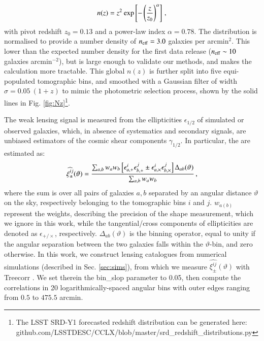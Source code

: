 \begin{eqnarray}
n (z) =  z^2 \: {\rm exp} \left[-\left(\frac{z}{z_0}\right)^\alpha \right]\, ,
\label{eq:nz}
\end{eqnarray}
with pivot redshift $z_0=0.13$ and a power-law index $\alpha = 0.78$.
The distribution is normalised to provide a number density of $n_{\rm eff} = 3.0 $  galaxies per arcmin$^{2}$.
This lower than the expected number density for the first data release ($n_{\rm eff}\sim10$ galaxies arcmin$^{-2}$), but is large enough to validate our methods, and makes the calculation more tractable.
This global $n(z)$ is further split into five equi-populated tomographic bins, and smoothed with a Gaussian filter of width $\sigma = 0.05 \: (1 + z)$ to mimic the photometric selection process, shown by the solid lines in Fig. \ref{fig:Nz}\footnote{The LSST SRD-Y1 forecasted redshift distribution can be generated here: github.com/LSSTDESC/CCLX/blob/master/srd\_redshift\_distributions.py}. 

The weak lensing signal is measured from the ellipticities $\epsilon_{1/2}$ of simulated or observed galaxies, which, in absence of systematics and secondary signals, are unbiased estimators  of the cosmic shear components $\gamma_{1/2}$.
In particular, the \gtwopcf are estimated as:
\begin{eqnarray}
\widehat{\xi_{\pm}^{ij}}(\vartheta) = \frac{\sum_{a,b} w_a w_b \left[\epsilon_{a, \rm +}^i\epsilon_{b, \rm +}^j     \pm \epsilon_{a, \times}^i\epsilon_{b, \times}^j    \right]\Delta_{ab}(\vartheta)}{\sum_{a,b} w_a w_b} \, ,
\label{eq:2PCF_estimator}
\end{eqnarray}
where the sum is over all pairs of galaxies $a, b$ separated by an angular distance $\vartheta$ on the sky, respectively belonging to the tomographic bins $i$ and $j$.
$w_{a (b)}$ represent the weights, describing the precision of the shape measurement, which we ignore in this work, while the tangential/cross components of ellipticities are denoted as $\epsilon_{+/\times}$, respectively. 
$\Delta_{ab}(\vartheta)$ is the binning operator, equal to unity if the angular separation between the two galaxies falls within the $\vartheta$-bin, and zero otherwise.
In this work, we construct lensing catalogues from numerical simulations (described in Sec. \ref{sec:sims}), from which we measure $ \widehat{\xi_{\pm}^{ij}}(\vartheta)$ with {\sc Treecorr} \citep{TreeCorr}.
We set therein the {\sc bin\_slop} parameter to 0.05, then compute the correlations in 20 logarithmically-spaced angular bins with outer edges ranging from $0.5$ to $475.5$ arcmin. 
 
